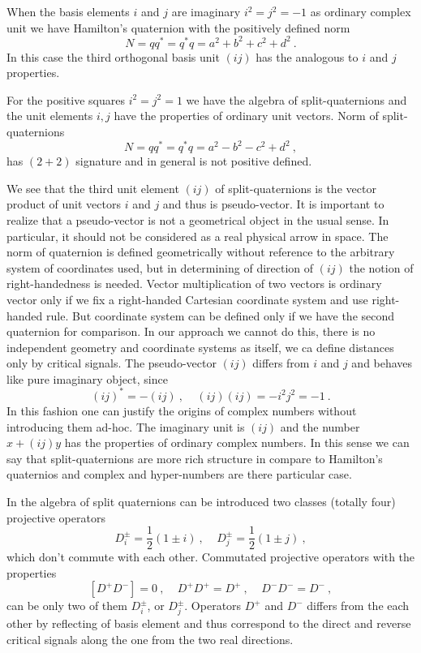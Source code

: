 \documentclass[a4paper,12pt]{article}
\begin{document}
When the basis elements $i$ and $j$ are imaginary $ i^2 = j^2 = -1 $ as ordinary complex 
unit we have Hamilton's quaternion with the positively defined norm 
\begin{equation} \label{Nq+}
N = qq^* = q^*q = a^2 + b^2 + c^2 +d^2 ~.
\end{equation} 
In this case the third orthogonal basis unit $(ij)$ has the analogous to $i$ and $j$ 
properties. 

For the positive squares $i^2= j^2 = 1$ we have the algebra of split-quaternions and 
the unit elements $i, j$ have the properties of ordinary unit vectors. Norm of 
split-quaternions
\begin{equation} \label{Nq-}
N = qq^* = q^*q = a^2 - b^2 - c^2 + d^2 ~, 
\end{equation}
has $(2+2)$ signature and in general is not positive defined. 

We see that the third unit element $(ij)$ of split-quaternions is the vector product of 
unit vectors $i$ and $j$ and thus is pseudo-vector. It is important to realize that a 
pseudo-vector is not a geometrical object in the usual sense. In particular, it should 
not be considered as a real physical arrow in space. The norm of quaternion is defined 
geometrically without reference to the arbitrary system of coordinates used, but in 
determining of direction of $(ij)$ the notion of right-handedness is needed. Vector 
multiplication of two vectors is ordinary vector only if we fix a right-handed Cartesian 
coordinate system and use right-handed rule. But coordinate system can be defined only 
if we have the second quaternion for comparison. In our approach we cannot do this, there 
is no independent geometry and coordinate systems as itself, we ca define distances only 
by critical signals. The pseudo-vector $(ij)$ differs from $i$ and $j$ and behaves like 
pure imaginary object, since
\begin{equation} \label{ij}
(ij)^* = - (ij) ~, ~~~~~ (ij)(ij) = - i^2j^2 = -1 ~.
\end{equation} 
In this fashion one can justify the origins of complex numbers without introducing them 
ad-hoc. The imaginary unit is $(ij)$ and the number $x + (ij)y$ has the properties of 
ordinary complex numbers. In this sense we can say that split-quaternions are more rich 
structure in compare to Hamilton's quaternios and complex and hyper-numbers are there 
particular case.

In the algebra of split quaternions can be introduced two classes (totally four) 
projective operators 
\begin{equation} \label{Dq}
D^\pm_i = \frac{1}{2}(1 \pm i) ~, ~~~~~ D^\pm_j = \frac{1}{2}(1 \pm j) ~, 
\end{equation}
which don't commute with each other. Commutated projective operators with the properties
\begin{equation} \label{D12}
[D^+D^-] = 0 ~, ~~~~~ D^+D^+ = D^+~, ~~~~~ D^-D^- = D^-~, 
\end{equation}
can be only two of them $D^\pm_i$, or $ D^\pm_j$. Operators $D^+$ and $D^-$ differs from 
the each other by reflecting of basis element and thus correspond to the direct and 
reverse critical signals along the one from the two real directions. 
\end{document}
